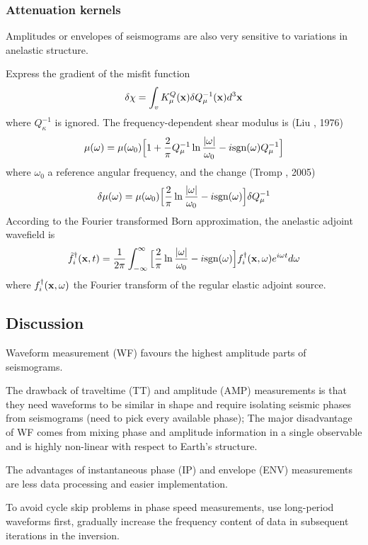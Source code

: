 \subsubsection{Attenuation kernels}
Amplitudes or envelopes of seismograms are also very sensitive to variations in anelastic structure.\par
Express the gradient of the misfit function
\[ \delta\chi=\int_vK_\mu^Q(\mathbf{x})\delta Q_\mu^{-1}(\mathbf{x})d^3\mathbf{x} \]
where $Q_\kappa^{-1}$ is ignored. The frequency-dependent shear modulus is (Liu \etal, 1976)
\[ \mu(\omega)=\mu(\omega_0)\Big[1+\frac{2}{\pi}Q_\mu^{-1}\ln\frac{|\omega|}{\omega_0}-i\text{sgn}(\omega)Q_\mu^{-1}\Big] \]
where $\omega_0$ a reference angular frequency, and the change (Tromp \etal, 2005)
\[ \delta\mu(\omega)=\mu(\omega_0)\Big[\frac{2}{\pi}\ln\frac{|\omega|}{\omega_0}-i\text{sgn}(\omega)\Big]\delta Q_\mu^{-1} \]
According to the Fourier transformed Born approximation, the anelastic adjoint wavefield is
\[ \tilde f_i^\dagger(\mathbf{x},t)=\frac{1}{2\pi}\int_{-\infty}^\infty\Big[\frac{2}{\pi}\ln\frac{|\omega|}{\omega_0}-i\text{sgn}(\omega)\Big]f_i^\dagger(\mathbf{x},\omega)e^{i\omega t}d\omega \]
where $f_i^\dagger(\mathbf{x},\omega)$ the Fourier transform of the regular elastic adjoint source.\par
\subsection{Discussion}
Waveform measurement (WF) favours the highest amplitude parts of seismograms.\par
The drawback of traveltime (TT) and amplitude (AMP) measurements is that they need waveforms to be similar in shape and require isolating seismic phases from seismograms (need to pick every available phase); The major disadvantage of WF comes from mixing phase and amplitude information in a single observable and is highly non-linear with respect to Earth's structure.\par
The advantages of instantaneous phase (IP) and envelope (ENV) measurements are less data processing and easier implementation.\par
To avoid cycle skip problems in phase speed measurements, use long-period waveforms first, gradually increase the frequency content of data in subsequent iterations in the inversion.\par
